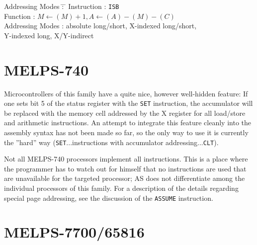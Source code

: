 \documentclass[12pt,twoside]{report}
\newcommand{\tty}[1]{{\tt #1}}
\begin{document}
\begin{tabbing}
Addressing Modes \= : \= \kill
Instruction      \> : \> \tty{ISB} \\
Function         \> : \> $M\leftarrow(M)+1, A\leftarrow(A)-(M)-(C)$ \\
Addressing Modes \> : \> absolute long/short, X-indexed long/short, \\
                 \>   \> Y-indexed long, X/Y-indirect \\
\end{tabbing}


\section{MELPS-740}

Microcontrollers of this family have a quite nice, however well-hidden
feature: If one sets bit 5 of the status register with the \tty{SET}
instruction, the accumulator will be replaced with the memory cell
addressed by the X register for all load/store and arithmetic
instructions.  An attempt to integrate this feature cleanly into the
assembly syntax has not been made so far, so the only way to use it
is currently the ''hard'' way (\tty{SET}...instructions with accumulator
addressing...\tty{CLT}).

Not all MELPS-740 processors implement all instructions.  This is a
place where the programmer has to watch out for himself that no
instructions are used that are unavailable for the targeted
processor; AS does not differentiate among the individual processors
of this family.  For a description of the details regarding special
page addressing, see the discussion of the \tty{ASSUME} instruction.


\section{MELPS-7700/65816}
\label{MELPS7700Spec}
\end{document}
